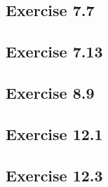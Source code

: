 \subsection{Exercise 7.7}


\subsection{Exercise 7.13}


\subsection{Exercise 8.9}


\subsection{Exercise 12.1}


\subsection{Exercise 12.3}
